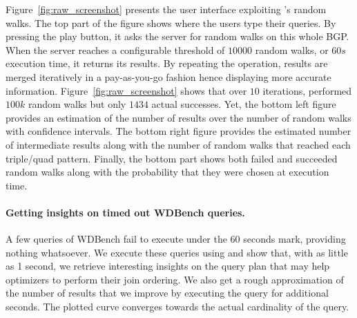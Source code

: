  
Figure~\ref{fig:raw_screenshot} presents the user interface exploiting
\NAME's random walks. The top part of the figure shows where the users
type their queries. By pressing the play button, it asks the server
for random walks on this whole BGP. When the server reaches a
configurable threshold of $10 000$ random walks, or $60s$ execution
time, it returns its results. By repeating the operation, results are
merged iteratively in a pay-as-you-go fashion hence displaying more
accurate information. Figure~\ref{fig:raw_screenshot} shows that over
$10$ iterations, \NAME performed $100k$ random walks but only $1434$
actual successes.  Yet, the bottom left figure provides an estimation
of the number of results over the number of random walks with
confidence intervals. The bottom right figure provides the estimated
number of intermediate results along with the number of random walks
that reached each triple/quad pattern.  Finally, the bottom part shows
both failed and succeeded random walks along with the probability that
they were chosen at execution time.

\paragraph{Getting insights on timed out WDBench queries.}
A few queries of WDBench fail to execute under the 60 seconds mark,
providing nothing whatsoever. We execute these queries using \NAME and
show that, with as little as 1 second, we retrieve interesting
insights on the query plan that may help optimizers to perform their
join ordering. We also get a rough approximation of the number of
results that we improve by executing the query for additional seconds.
The plotted curve converges towards the actual cardinality of the query.
